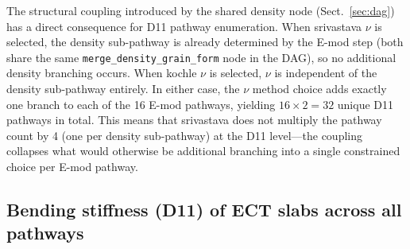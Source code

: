 \documentclass[hess, manuscript]{copernicus}
\begin{document}

The structural coupling introduced by the shared density node (Sect.~\ref{sec:dag}) has a direct consequence for D11 pathway enumeration. When srivastava $\nu$ is selected, the density sub-pathway is already determined by the E-mod step (both share the same \texttt{merge\_density\_grain\_form} node in the DAG), so no additional density branching occurs. When kochle $\nu$ is selected, $\nu$ is independent of the density sub-pathway entirely. In either case, the $\nu$ method choice adds exactly one branch to each of the 16 E-mod pathways, yielding $16 \times 2 = 32$ unique D11 pathways in total. This means that srivastava does not multiply the pathway count by 4 (one per density sub-pathway) at the D11 level—the coupling collapses what would otherwise be additional branching into a single constrained choice per E-mod pathway.

\FloatBarrier

\subsection{Bending stiffness (D11) of ECT slabs across all pathways}
\label{sec:D11_results}

%
%
%
\end{document}
